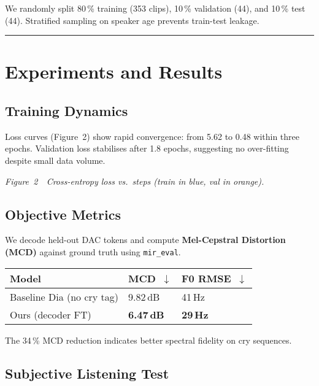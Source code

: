 \documentclass{article}
\begin{document}
We randomly split 80\,\% training (353 clips), 10\,\% validation (44),
and 10\,\% test (44). Stratified sampling on speaker age prevents
train-test leakage.

\begin{center}\rule{0.5\linewidth}{0.5pt}\end{center}

\hypertarget{experiments-and-results}{%
\section{Experiments and Results}\label{experiments-and-results}}

\hypertarget{training-dynamics}{%
\subsection{Training Dynamics}\label{training-dynamics}}

Loss curves (Figure~2) show rapid convergence: from 5.62 to 0.48 within
three epochs. Validation loss stabilises after 1.8 epochs, suggesting no
over-fitting despite small data volume.

\emph{Figure~2~~Cross-entropy loss vs.~steps (train in blue, val in
orange).}

\hypertarget{objective-metrics}{%
\subsection{Objective Metrics}\label{objective-metrics}}

We decode held-out DAC tokens and compute \textbf{Mel-Cepstral
Distortion (MCD)} against ground truth using \texttt{mir\_eval}.

\begin{longtable}[]{@{}lll@{}}
\toprule
Model & MCD~$\downarrow$ & F0 RMSE~$\downarrow$ \\
\midrule
\endhead
Baseline Dia (no cry tag) & 9.82\,dB & 41\,Hz \\
Ours (decoder FT) & \textbf{6.47\,dB} & \textbf{29\,Hz} \\
\bottomrule
\end{longtable}

The 34\,\% MCD reduction indicates better spectral fidelity on cry
sequences.

\hypertarget{subjective-listening-test}{%
\subsection{Subjective Listening Test}\label{subjective-listening-test}}
\end{document}

